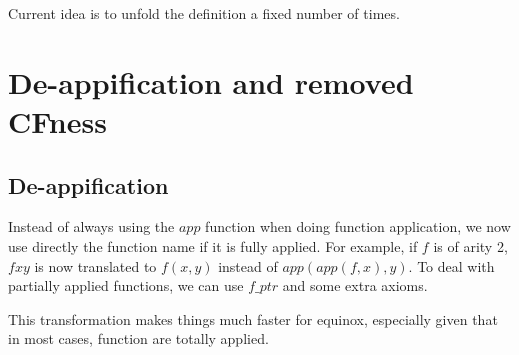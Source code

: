 \documentclass{article}
\begin{document}
Current idea is to unfold the definition a fixed number of times.

\section{De-appification and removed CFness}
\subsection{De-appification}
Instead of always using the $app$ function when doing function
application, we now use directly the function name if it is fully
applied. For example, if $f$ is of arity 2, $f x y$ is now translated
to $f(x,y)$ instead of $app(app(f,x),y)$.  To deal with partially
applied functions, we can use $f\_ptr$ and some extra axioms. 

This transformation makes things much faster for equinox, especially
given that in most cases, function are totally applied.
\end{document}
